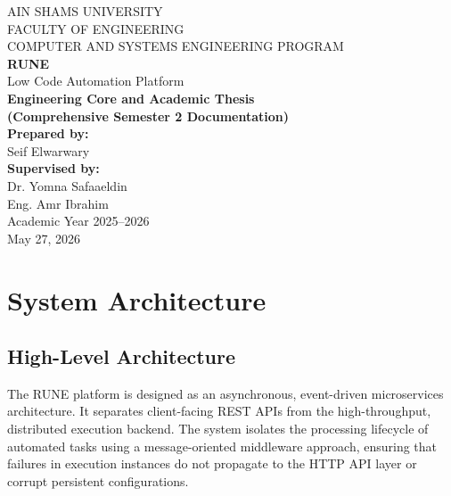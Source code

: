 \documentclass[12pt]{report}
\begin{document}
\begin{titlepage}
  \begin{center}
    \large AIN SHAMS UNIVERSITY \\
    FACULTY OF ENGINEERING \\
    COMPUTER AND SYSTEMS ENGINEERING PROGRAM \\
    \vspace{2.5cm}
    \Huge \textbf{RUNE} \\
    \vspace{0.5cm}
    \Large Low Code Automation Platform \\
    \vspace{1.5cm}
    \LARGE \textbf{Engineering Core and Academic Thesis \\ (Comprehensive Semester 2 Documentation)} \\
    \vspace{2cm}
    \large \textbf{Prepared by:} \\
    Seif Elwarwary \\
    \vspace{1cm}
    \textbf{Supervised by:} \\
    Dr. Yomna Safaaeldin \\
    Eng. Amr Ibrahim \\
    \vspace{2.5cm}
    Academic Year 2025--2026 \\
    May 27, 2026
  \end{center}
\end{titlepage}

\tableofcontents
\newpage
{}

\chapter{System Architecture}
\label{ch:system_architecture}

\section{High-Level Architecture}
The RUNE platform is designed as an asynchronous, event-driven microservices architecture. It separates client-facing REST APIs from the high-throughput, distributed execution backend. The system isolates the processing lifecycle of automated tasks using a message-oriented middleware approach, ensuring that failures in execution instances do not propagate to the HTTP API layer or corrupt persistent configurations.
\end{document}
